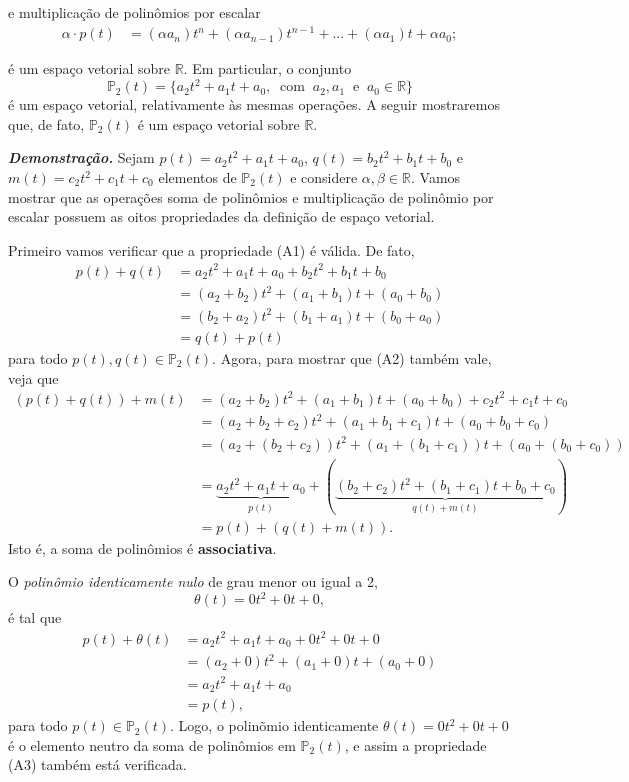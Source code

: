 \begin{enumerate}
 e multiplicação de polinômios por escalar
\begin{align*}
\alpha \cdot   p(t)&=(\alpha a_n)t^n+(\alpha a_{n-1})t^{n-1}+...+(\alpha a_1)t+\alpha a_0;
\end{align*}


é um espaço vetorial sobre $\mathbb{R}$.  Em particular,  o conjunto $$\mathbb{P}_2(t)=\{a_2t^2+a_1t+a_0,\; \;\text{com}\; \;  a_2, a_1 \;\; \text{e}\;\; a_0  \in \mathbb{R}\}$$   é um espaço vetorial, relativamente às mesmas operações. A seguir mostraremos que, de fato, $\mathbb{P}_2(t)$ é um espaço vetorial sobre $\mathbb{R}$.

\textbf{\textit{Demonstração.}}  Sejam $p(t)=a_2t^2+a_1t+a_0$, $q(t)=b_2t^2+b_1t+b_0$ e $m(t)=c_2t^2+c_1t+c_0$ elementos de $\mathbb{P}_2(t)$ e considere $\alpha , \beta \in \mathbb{R}$. Vamos mostrar que as operações soma de polinômios e multiplicação de polinômio por escalar possuem  as oitos propriedades da definição de espaço vetorial.

Primeiro vamos verificar que a propriedade (A1) é válida.  De fato,
\begin{align*}
p(t)+q(t)&=a_2t^2+a_1t+a_0+b_2t^2+b_1t+b_0\\
               &=(a_2+b_2)t^2+(a_1+b_1)t+(a_0+b_0)\\
               &=(b_2+a_2)t^2+(b_1+a_1)t+(b_0+a_0)\\
               &=q(t)+p(t)
\end{align*}
para todo $p(t), q(t) \in  \mathbb{P}_2(t)$. Agora, para mostrar que (A2) também vale, veja que
\begin{align*}
(p(t)+q(t))+m(t)&=(a_2+b_2)t^2+(a_1+b_1)t+(a_0+b_0)+c_2t^2+c_1t+c_0\\
               &=(a_2+b_2+c_2)t^2+(a_1+b_1+c_1)t+(a_0+b_0+c_0)\\
               &=(a_2+(b_2+c_2))t^2+(a_1+(b_1+c_1))t+(a_0+(b_0+c_0))\\
               &=\underbrace{a_2t^2+a_1t+a_0}_{p(t)} + (\underbrace{(b_2+c_2)t^2+(b_1+c_1)t+b_0+c_0}_{q(t)+m(t)})\\
               &=p(t)+(q(t)+m(t)).
\end{align*} Isto é, a soma de polinômios é \textbf{associativa}.

O \textit{polinômio identicamente nulo} de grau menor ou igual  a 2, $$\theta(t)=0t^2+0t+0,$$   é tal que
\begin{align*}
p(t)+\theta(t)&=a_2t^2+a_1t+a_0+0t^2+0t+0\\
               &=(a_2+0)t^2+(a_1+0)t+(a_0+0)\\
               &=a_2t^2+a_1t+a_0\\
               &=p(t),
\end{align*}
para todo $p(t) \in \mathbb{P}_2(t)$.  Logo, o polinõmio identicamente $\theta(t)=0t^2+0t+0$ é o  elemento neutro da soma de polinômios em  $\mathbb{P}_2(t)$, e assim a propriedade (A3) também está verificada.


\end{enumerate}
